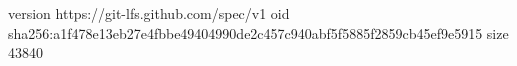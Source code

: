 version https://git-lfs.github.com/spec/v1
oid sha256:a1f478e13eb27e4fbbe49404990de2c457c940abf5f5885f2859cb45ef9e5915
size 43840
